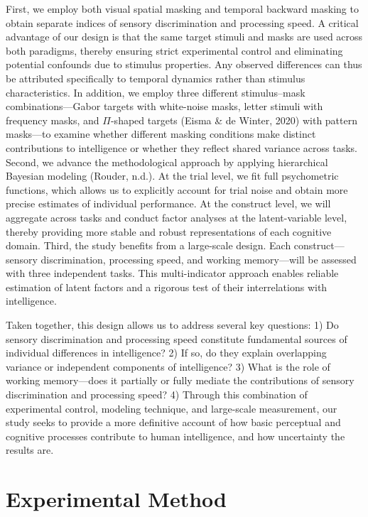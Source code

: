 \documentclass[
  ,man]{apa6}
\begin{document}
First, we employ both visual spatial masking and temporal backward masking to obtain separate indices of sensory discrimination and processing speed. A critical advantage of our design is that the same target stimuli and masks are used across both paradigms, thereby ensuring strict experimental control and eliminating potential confounds due to stimulus properties. Any observed differences can thus be attributed specifically to temporal dynamics rather than stimulus characteristics. In addition, we employ three different stimulus--mask combinations---Gabor targets with white-noise masks, letter stimuli with frequency masks, and \(\Pi\)-shaped targets (Eisma \& de Winter, 2020) with pattern masks---to examine whether different masking conditions make distinct contributions to intelligence or whether they reflect shared variance across tasks. Second, we advance the methodological approach by applying hierarchical Bayesian modeling (Rouder, n.d.). At the trial level, we fit full psychometric functions, which allows us to explicitly account for trial noise and obtain more precise estimates of individual performance. At the construct level, we will aggregate across tasks and conduct factor analyses at the latent-variable level, thereby providing more stable and robust representations of each cognitive domain. Third, the study benefits from a large-scale design. Each construct---sensory discrimination, processing speed, and working memory---will be assessed with three independent tasks. This multi-indicator approach enables reliable estimation of latent factors and a rigorous test of their interrelations with intelligence.

Taken together, this design allows us to address several key questions: 1) Do sensory discrimination and processing speed constitute fundamental sources of individual differences in intelligence? 2) If so, do they explain overlapping variance or independent components of intelligence? 3) What is the role of working memory---does it partially or fully mediate the contributions of sensory discrimination and processing speed? 4) Through this combination of experimental control, modeling technique, and large-scale measurement, our study seeks to provide a more definitive account of how basic perceptual and cognitive processes contribute to human intelligence, and how uncertainty the results are.

\section{Experimental Method}\label{experimental-method}
\end{document}
